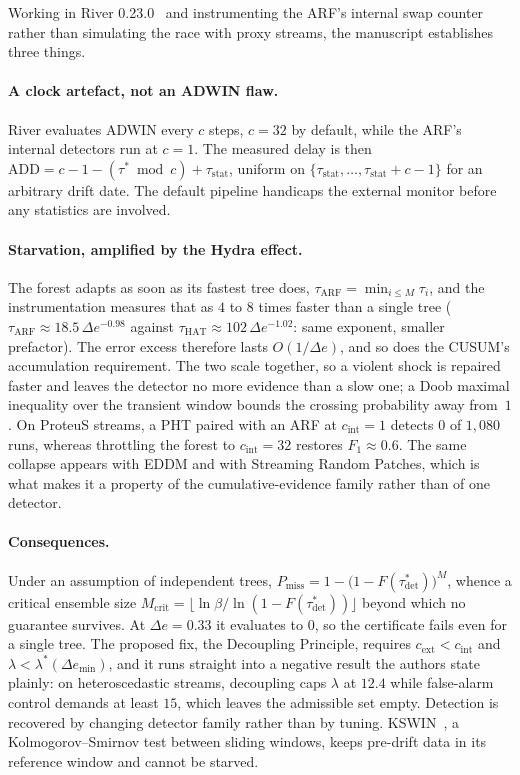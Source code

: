 \documentclass[10pt,a4paper]{article}
\begin{document}
Working in River 0.23.0~\cite{montiel2021} and instrumenting the ARF's internal swap counter
rather than simulating the race with proxy streams, the manuscript establishes three things.

\paragraph{A clock artefact, not an ADWIN flaw.} River evaluates ADWIN every $c$ steps,
$c=32$ by default, while the ARF's internal detectors run at $c=1$. The measured delay is
then $\mathrm{ADD}=c-1-(\tau^{*}\bmod c)+\tau_{\mathrm{stat}}$, uniform on
$\{\tau_{\mathrm{stat}},\dots,\tau_{\mathrm{stat}}+c-1\}$ for an arbitrary drift date. The
default pipeline handicaps the external monitor before any statistics are involved.

\paragraph{Starvation, amplified by the Hydra effect.} The forest adapts as soon as its
fastest tree does, $\tau_{\mathrm{ARF}}=\min_{i\le M}\tau_i$, and the instrumentation
measures that as $4$ to $8$ times faster than a single tree
($\tau_{\mathrm{ARF}}\approx18.5\,\Delta e^{-0.98}$ against
$\tau_{\mathrm{HAT}}\approx102\,\Delta e^{-1.02}$: same exponent, smaller prefactor). The
error excess therefore lasts $O(1/\Delta e)$, and so does the CUSUM's accumulation
requirement. The two scale together, so a violent shock is repaired faster and leaves the
detector no more evidence than a slow one; a Doob maximal inequality over the transient
window bounds the crossing probability away from~$1$. On ProteuS streams, a PHT paired with
an ARF at $c_{\mathrm{int}}{=}1$ detects $0$ of $1{,}080$ runs, whereas throttling the
forest to $c_{\mathrm{int}}{=}32$ restores $F_1\approx0.6$. The same collapse appears with
EDDM and with Streaming Random Patches, which is what makes it a property of the
cumulative-evidence family rather than of one detector.

\paragraph{Consequences.} Under an assumption of independent trees,
$P_{\mathrm{miss}}=1-\bigl(1-F(\tau^{*}_{\det})\bigr)^{M}$, whence a critical ensemble size
$M_{\mathrm{crit}}=\lfloor\ln\beta/\ln(1-F(\tau^{*}_{\det}))\rfloor$ beyond which no
guarantee survives. At $\Delta e=0.33$ it evaluates to $0$, so the certificate fails even
for a single tree. The proposed fix, the Decoupling Principle, requires
$c_{\mathrm{ext}}<c_{\mathrm{int}}$ and $\lambda<\lambda^{*}(\Delta e_{\min})$, and it runs
straight into a negative result the authors state plainly: on heteroscedastic streams,
decoupling caps $\lambda$ at $12.4$ while false-alarm control demands at least $15$, which
leaves the admissible set empty. Detection is recovered by changing detector family rather
than by tuning. KSWIN~\cite{raab2020}, a Kolmogorov--Smirnov test between sliding windows,
keeps pre-drift data in its reference window and cannot be starved.
\end{document}
